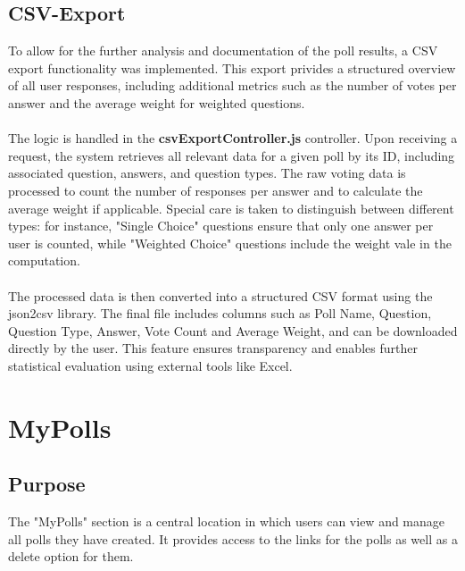 \documentclass[a4paper,12pt]{report}
\begin{document}
\subsection{CSV-Export}
To allow for the further analysis and documentation of the poll results, a CSV export functionality was implemented. This export privides a structured overview of all user responses, including additional metrics such as the number of votes per answer and the average weight for weighted questions.\\ \\
The logic is handled in the \textbf{csvExportController.js} controller. Upon receiving a request, the system retrieves all relevant data for a given poll by its ID, including associated question, answers, and question types. The raw voting data is processed to count the number of responses per answer and to calculate the average weight if applicable. Special care is taken to distinguish between different types: for instance, "Single Choice" questions ensure that only one answer per user is counted, while "Weighted Choice" questions include the weight vale in the computation.\\ \\
The processed data is then converted into a structured CSV format using the json2csv library. The final file includes columns such as Poll Name, Question, Question Type, Answer, Vote Count and Average Weight, and can be downloaded directly by the user. This feature ensures transparency and enables further statistical evaluation using external tools like Excel.\parencite{json2csv}

\section{MyPolls}
\subsection{Purpose}
The "MyPolls" section is a central location in which users can view and manage all polls they have created. It provides access to the links for the polls as well as a delete option for them.
\end{document}
